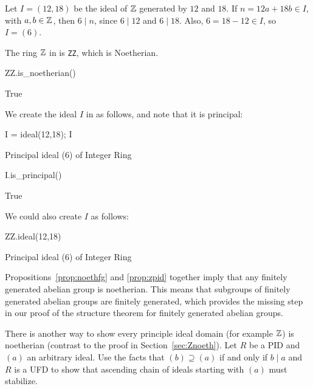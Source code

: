 \begin{example}
Let $I=(12,18)$ be the ideal of $\mathbb{Z}$ generated by $12$ and $18$.
If $n=12a+18b\in I$, with $a,b\in\mathbb{Z}$, 
then $6\mid n$, since $6\mid 12$ and $6\mid 18$.
Also, $6=18-12\in I$, so $I=(6)$.

The ring $\mathbb{Z}$
in \sage{} is {\tt ZZ}, which is Noetherian.
\begin{sagecode}
\begin{sagecell}
ZZ.is_noetherian()
\end{sagecell}
\begin{sageout}
True
\end{sageout}
\end{sagecode}
We create the ideal $I$ in \sage{} as follows, and note that
it is principal:
\begin{sagecode}
\begin{sagecell}
I = ideal(12,18); I
\end{sagecell}
\begin{sageout}
Principal ideal (6) of Integer Ring
\end{sageout}
\begin{sagecell}
I.is_principal()
\end{sagecell}
\begin{sageout}
True
\end{sageout}
\end{sagecode}
We could also create $I$ as follows:
\begin{sagecode}
\begin{sagecell}
ZZ.ideal(12,18)
\end{sagecell}
\begin{sageout}
Principal ideal (6) of Integer Ring
\end{sageout}
\end{sagecode}
\end{example}

Propositions~\ref{prop:noethfg} and \ref{prop:zpid} together imply that
any finitely generated abelian group is noetherian.  This means that
subgroups of finitely generated abelian groups are finitely generated,
which provides the missing step in our proof of the structure theorem
for finitely generated abelian groups.

\begin{exercise}
	There is another way to show every principle ideal domain (for example $\mathbb{Z}$) is noetherian (contrast to the proof in Section~\ref{sec:Znoeth}). Let $R$ be a PID and $(a)$ an arbitrary ideal. Use the facts that $(b)\supseteq(a)$ if and only if $b \mid a$ and $R$ is a UFD to show that ascending chain of ideals starting with $(a)$ must stabilize.
\end{exercise}

